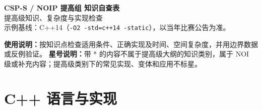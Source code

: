 \documentclass[a4paper,11pt]{article}
\newcommand{\code}[1]{\texttt{#1}}
\begin{document}
\thispagestyle{empty}
\begin{center}
{\LARGE\bfseries CSP-S / NOIP 提高组 知识自查表} \\
\vspace{3mm}
{\large 提高级知识、复杂度与实现检查} \\
\vspace{3mm}
{\small 示例基线：C++14（\code{-O2 -std=c++14 -static}），以当年比赛公告为准。}
\end{center}

{\small\textbf{使用说明：}按知识点检查适用条件、正确实现及时间、空间复杂度，并用边界数据或反例验证。}
{\small\textbf{星号说明：}带 * 的内容不属于提高级大纲的知识类别，属于 NOI 级或补充内容；提高级类别下的常见实现、变体和应用不标星。}

\vspace{2mm}
\tableofcontents
\newpage

\section{C++ 语言与实现}
\end{document}
